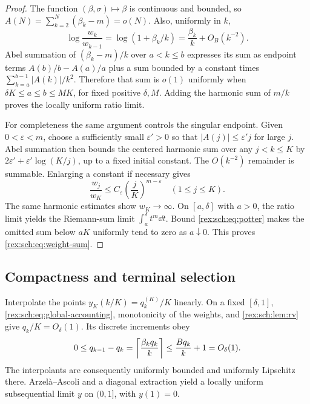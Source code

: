 \begin{proof}
The function $(\beta,\sigma)\mapsto\beta$ is continuous and bounded,
so $A(N)=\sum_{k=2}^N(\beta_k-m)=o(N)$. Also, uniformly in $k$,
\[
 \log\frac{w_k}{w_{k-1}}
 =\log(1+\beta_k/k)=\frac{\beta_k}{k}+O_B(k^{-2}).
\]
Abel summation of $(\beta_k-m)/k$ over $a<k\leq b$ expresses its
sum as endpoint terms $A(b)/b-A(a)/a$ plus a sum bounded by a constant
times $\sum_{k=a}^{b-1}|A(k)|/k^2$. Therefore that sum is $o(1)$
uniformly when $\delta K\leq a\leq b\leq M K$, for fixed positive
$\delta,M$. Adding the harmonic sum of $m/k$ proves the locally
uniform ratio limit.

For completeness the same argument controls the singular endpoint.
Given $0<\varepsilon<m$, choose a sufficiently small $\varepsilon'>0$
so that $|A(j)|\leq\varepsilon'j$ for large $j$. Abel summation then
bounds the centered harmonic sum over any $j<k\leq K$ by
$2\varepsilon'+\varepsilon'\log(K/j)$, up to a fixed initial constant.
The $O(k^{-2})$ remainder is summable. Enlarging a constant if necessary
gives
\begin{equation}\label{rex:sch:eq:potter}
 \frac{w_j}{w_K}\leq C_\varepsilon
 \left(\frac{j}{K}\right)^{m-\varepsilon}
 \quad(1\leq j\leq K).
\end{equation}
The same harmonic estimates show $w_K\to\infty$.
On $[a,\delta]$ with $a>0$, the ratio limit yields the Riemann-sum
limit $\int_a^\delta t^m\dd t$. Bound \eqref{rex:sch:eq:potter} makes the
omitted sum below $aK$ uniformly tend to zero as $a\downarrow0$.
This proves \eqref{rex:sch:eq:weight-sum}.
\end{proof}

\subsection{Compactness and terminal selection}

Interpolate the points $y_K(k/K)=q_k^{(K)}/K$ linearly. On a fixed
$[\delta,1]$, \eqref{rex:sch:eq:global-accounting}, monotonicity of the
weights, and \cref{rex:sch:lem:rv} give $q_k/K=O_\delta(1)$. Its discrete
increments obey
\begin{equation}\label{rex:sch:eq:slope-bound}
 0\leq q_{k-1}-q_k=\left\lceil \frac{\beta_kq_k}{k}\right\rceil
 \leq\frac{Bq_k}{k}+1=O_\delta(1).
\end{equation}
The interpolants are consequently uniformly bounded and uniformly
Lipschitz there. Arzel\`a--Ascoli and a diagonal extraction yield a
locally uniform subsequential limit $y$ on $(0,1]$, with $y(1)=0$.

